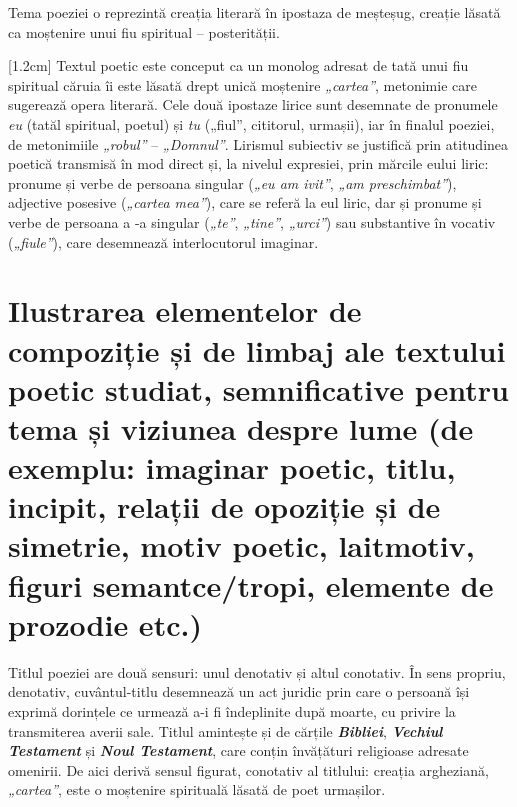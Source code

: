\documentclass[
12pt,
a4paper
]{article}
\newcommand{\rom}[1]{\uppercase\expandafter{\romannumeral #1\relax}} %
\newcommand{\operatitle}{\textbf{\textit{„Testament”\ }}} %
\begin{document}
Tema poeziei o reprezintă creația literară în ipostaza de meșteșug, creație lăsată ca moștenire unui fiu spiritual -- posterității.

[1.2cm]
Textul poetic este conceput ca un monolog adresat de tată unui fiu spiritual căruia îi este lăsată drept unică moștenire \textit{„cartea”}, metonimie care sugerează opera literară. Cele două ipostaze lirice sunt desemnate de pronumele \textit{eu} (tatăl spiritual, poetul) și \textit{tu} („fiul”, cititorul, urmașii), iar în finalul poeziei, de metonimiile \textit{„robul”} -- \textit{„Domnul”}. Lirismul subiectiv se justifică prin atitudinea poetică transmisă în mod direct și, la nivelul expresiei, prin mărcile eului liric: pronume și verbe de persoana \rom{1} singular (\textit{„eu am ivit”}, \textit{„am preschimbat”}), adjective posesive (\textit{„cartea mea”}), care se referă la eul liric, dar și pronume și verbe de persoana a \rom{2}-a singular (\textit{„te”}, \textit{„tine”}, \textit{„urci”}) sau substantive în vocativ (\textit{„fiule”}), care desemnează interlocutorul imaginar.




\section{Ilustrarea elementelor de compoziție și de limbaj ale textului poetic studiat, semnificative pentru tema și viziunea despre lume {\footnotesize (de exemplu: imaginar poetic, titlu, incipit, relații de opoziție și de simetrie, motiv poetic, laitmotiv, figuri semantce/tropi, elemente de prozodie etc.)}}

Titlul poeziei are două sensuri: unul denotativ și altul conotativ. În sens propriu, denotativ, cuvântul-titlu desemnează un act juridic prin care o persoană își exprimă dorințele ce urmează a-i fi îndeplinite după moarte, cu privire la transmiterea averii sale. Titlul amintește și de cărțile \textbf{\textit{Bibliei}}, \textbf{\textit{Vechiul Testament}} și \textbf{\textit{Noul Testament}}, care conțin învățături religioase adresate omenirii. De aici derivă sensul figurat, conotativ al titlului: creația argheziană, \textit{„cartea”}, este o moștenire spirituală lăsată de poet urmașilor.
\end{document}
